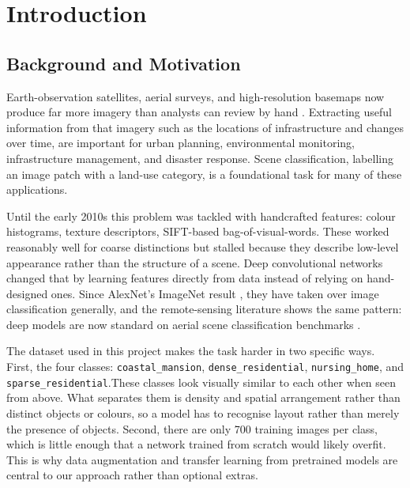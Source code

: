 \documentclass[11pt,twoside,a4paper]{article}
\begin{document}



\tableofcontents
\newpage

\section{Introduction}

\subsection{Background and Motivation}
Earth-observation satellites, aerial surveys, and high-resolution basemaps now produce far more imagery than analysts can review by hand \cite{Zhu2017}. Extracting useful information from that imagery such as the locations of infrastructure and changes over time, are important for urban planning, environmental monitoring, infrastructure management, and disaster response. Scene classification, labelling an image patch with a land-use category, is a foundational task for many of these applications.

Until the early 2010s this problem was tackled with handcrafted features: colour histograms, texture descriptors, SIFT-based bag-of-visual-words. These worked reasonably well for coarse distinctions but stalled because they describe low-level appearance rather than the structure of a scene. Deep convolutional networks changed that by learning features directly from data instead of relying on hand-designed ones. Since AlexNet's ImageNet result \cite{Krizhevsky2012}, they have taken over image classification generally, and the remote-sensing literature shows the same pattern: deep models are now standard on aerial scene classification benchmarks \cite{Cheng2020}.

The dataset used in this project makes the task harder in two specific ways. First, the four classes: \texttt{coastal\_mansion}, \texttt{dense\_residential}, \texttt{nursing\_home}, and \texttt{sparse\_residential}.These classes look visually similar to each other when seen from above. What separates them is density and spatial arrangement rather than distinct objects or colours, so a model has to recognise layout rather than merely the presence of objects. Second, there are only 700 training images per class, which is little enough that a network trained from scratch would likely overfit. This is why data augmentation and transfer learning from pretrained models are central to our approach rather than optional extras.
\end{document}
